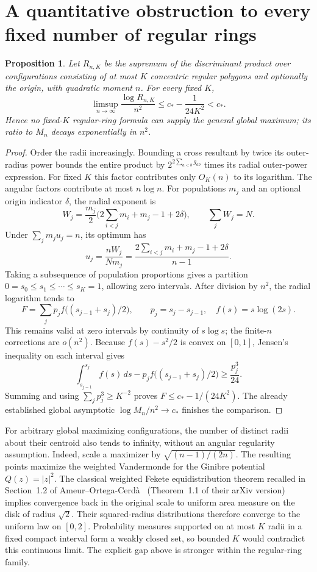 \documentclass[11pt]{article}
\newtheorem{proposition}[theorem]{Proposition}
\theoremstyle{remark}
\numberwithin{equation}{section}
\begin{document}
\section{A quantitative obstruction to every fixed number of regular rings}
\label{sec:fixed-ring-obstruction}

\begin{proposition}\label{prop:fixed-ring-gap}
Let $R_{n,K}$ be the supremum of the discriminant product over
configurations consisting of at most $K$ concentric regular
polygons and optionally the origin, with quadratic moment $n$.
For every fixed $K$,
\[
 \limsup_{n\to\infty}\frac{\log R_{n,K}}{n^2}
 \le c_*-\frac1{24K^2}<c_*.
\]
Hence no fixed-$K$ regular-ring formula can supply the general
global maximum; its ratio to $M_n$ decays exponentially in $n^2$.
\end{proposition}

\begin{proof}
Order the radii increasingly.  Bounding a cross resultant by
twice its outer-radius power bounds the entire product by
$2^{2\sum_{a<b}g_{ab}}$ times its radial outer-power expression.
For fixed $K$ this factor contributes only $O_K(n)$ to its
logarithm.  The angular factors contribute at most $n\log n$.
For populations $m_j$ and an optional origin indicator $\delta$,
the radial exponent is
\[
 W_j=\frac{m_j}{2}
   \bigl(2\sum_{i<j}m_i+m_j-1+2\delta\bigr),
 \qquad \sum_jW_j=N.
\]
Under $\sum_jm_ju_j=n$, its optimum has
\[
 u_j=\frac{nW_j}{Nm_j}
 =\frac{2\sum_{i<j}m_i+m_j-1+2\delta}{n-1}.
\]
Taking a subsequence of population proportions gives a partition
$0=s_0\le s_1\le\cdots\le s_K=1$, allowing zero intervals.
After division by $n^2$, the radial logarithm tends to
\[
 F=\sum_jp_j f\bigl((s_{j-1}+s_j)/2\bigr),
 \qquad p_j=s_j-s_{j-1},\quad f(s)=s\log(2s).
\]
This remains valid at zero intervals by continuity of
$s\log s$; the finite-$n$ corrections are $o(n^2)$.
Because $f(s)-s^2/2$ is convex on $[0,1]$, Jensen's inequality
on each interval gives
\[
 \int_{s_{j-1}}^{s_j}f(s)\,ds
 -p_jf\bigl((s_{j-1}+s_j)/2\bigr)
 \ge\frac{p_j^3}{24}.
\]
Summing and using $\sum_jp_j^3\ge K^{-2}$ proves
$F\le c_*-1/(24K^2)$.
The already established global asymptotic
$\log M_n/n^2\to c_*$ finishes the comparison.
\end{proof}

For arbitrary global maximizing configurations, the number of
distinct radii about their centroid also tends to infinity,
without an angular regularity assumption.
Indeed, scale a maximizer by
$\sqrt{(n-1)/(2n)}$.  The resulting points maximize the weighted
Vandermonde for the Ginibre potential $Q(z)=|z|^2$.
The classical weighted Fekete equidistribution theorem recalled
in Section~1.2 of Ameur--Ortega-Cerd\`a~\cite{AOC}
(Theorem~1.1 of their arXiv version) implies
convergence back in the original scale to uniform area measure
on the disk of radius $\sqrt2$.
Their squared-radius distributions therefore converge to the
uniform law on $[0,2]$.
Probability measures supported on at most $K$ radii in a fixed
compact interval form a weakly closed set, so bounded $K$ would
contradict this continuous limit.  The explicit gap above is
stronger within the regular-ring family.
\end{document}
